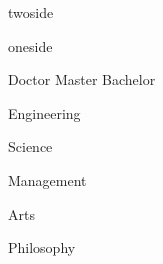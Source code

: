 \newif\ifoneortwosidetwoside
\newif\ifoneortwosideoneside

\def\temp{twoside}
\ifx\temp\oneortwoside
  \oneortwosidetwosidetrue  \oneortwosideonesidefalse
\fi

\def\temp{oneside}
\ifx\temp\oneortwoside
  \oneortwosidetwosidefalse  \oneortwosideonesidetrue
\fi

\newif\ifxueweidoctor
\newif\ifxueweimaster
\newif\ifxueweibachelor

\def\temp{Doctor}
\ifx\temp\xuewei %
  \xueweidoctortrue  \xueweimasterfalse \xueweibachelorfalse
\fi
\def\temp{Master}
\ifx\temp\xuewei
  \xueweidoctorfalse  \xueweimastertrue \xueweibachelorfalse
\fi
\def\temp{Bachelor}
\ifx\temp\xuewei
  \xueweidoctorfalse  \xueweimasterfalse \xueweibachelortrue
\fi

\ifxueweidoctor
  \newcommand{\cnxuewei}{博士}
  \newcommand{\enxuewei}{Doctor}
\fi

\ifxueweimaster
  \newcommand{\cnxuewei}{硕士}
  \newcommand{\enxuewei}{Master}
\fi

\ifxueweibachelor
  \newcommand{\cnxuewei}{学士}
  \newcommand{\enxuewei}{Bachelor}
\fi

\def \xuekeEngineering {Engineering}
\def \xuekeScience     {Science}
\def \xuekeManagement  {Management}
\def \xuekeArts        {Arts}
\def \xuekePhilosophy  {Philosophy}
\def \xuekeEconomics   {Economics}
\def \xuekeLaws        {Laws}
\def \xuekeEducation   {Education}
\def \xuekeHistory     {History}


\ifx \xueke \xuekeEngineering
\newcommand{\cnxueke}{工学}
\newcommand{\enxueke}{Engineering}
\newcommand{\enxk}   {Eng}
\fi

\ifx \xueke \xuekeScience
\newcommand{\cnxueke}{理学}
\newcommand{\enxueke}{Science}
\newcommand{\enxk}   {Sci}
\fi

\ifx \xueke \xuekeManagement
\newcommand{\cnxueke}{管理学}
\newcommand{\enxueke}{Management}
\newcommand{\enxk}   {Man}
\fi

\ifx \xueke \xuekeArts
\newcommand{\cnxueke}{文学}
\newcommand{\enxueke}{Arts}
\newcommand{\enxk}   {Art}
\fi

\ifx \xueke \xuekePhilosophy
\newcommand{\cnxueke}{哲学}
\newcommand{\enxueke}{Philosophy}
\newcommand{\enxk}   {Phi}
\fi

